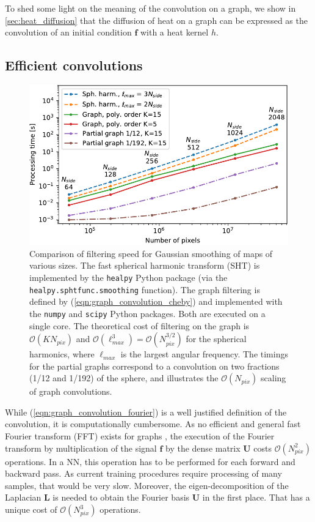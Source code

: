 \documentclass[final,twocolumn,3p,times,sort&compress]{elsarticle}
\newcommand{\eqnref}[1]{(\ref{eqn:#1})}
\renewcommand{\b}[1]{{\bm{#1}}}   %
\newcommand{\1}{\b{1}}              %
\newcommand{\0}{\b{0}}              %
\renewcommand{\L}{\b{L}}
\newcommand{\U}{\b{U}}
\newcommand{\f}{\b{f}}
\newcommand{\bO}{\mathcal{O}}
\begin{document}
To shed some light on the meaning of the convolution on a graph, we show in \ref{sec:heat_diffusion} that the diffusion of heat on a graph can be expressed as the convolution of an initial condition $\f$ with a heat kernel $h$.

\subsection{Efficient convolutions}
\label{sec:efficient_convolution}

\begin{figure}[t!]
    \centering
    \includegraphics[width=\linewidth]{filtering_speed}
    \caption{Comparison of filtering speed for Gaussian smoothing of maps of various sizes.
    The fast spherical harmonic transform (SHT) is implemented by the \texttt{healpy} Python package (via the \texttt{healpy.sphtfunc.smoothing} function).
    The graph filtering is defined by \eqnref{graph_convolution_cheby} and implemented with the \texttt{numpy} and \texttt{scipy} Python packages.
    Both are executed on a single core.
	The theoretical cost of filtering on the graph is $\bO(K N_{pix})$ and $\bO(\ell_{max}^3) = \bO(N_{pix}^{3/2})$ for the spherical harmonics, where $\ell_{max}$ is the largest angular frequency.
	The timings for the partial graphs correspond to a convolution on two fractions (1/12 and 1/192) of the sphere, and illustrates the $\bO(N_{pix})$ scaling of graph convolutions.
	}
    \label{fig:filtering_speed}
\end{figure}

While \eqnref{graph_convolution_fourier} is a well justified definition of the convolution, it is computationally cumbersome.
As no efficient and general fast Fourier transform (FFT) exists for graphs \citep{le2018fgft}, the execution of the Fourier transform by multiplication of the signal $\f$ by the dense matrix $\U$ costs $\bO(N_{pix}^2)$ operations.
In a NN, this operation has to be performed for each forward and backward pass.
As current training procedures require processing of many samples, that would be very slow.
Moreover, the eigen-decomposition of the Laplacian $\L$ is needed to obtain the Fourier basis $\U$ in the first place.
That has a unique cost of $\bO(N_{pix}^3)$ operations.
\end{document}
